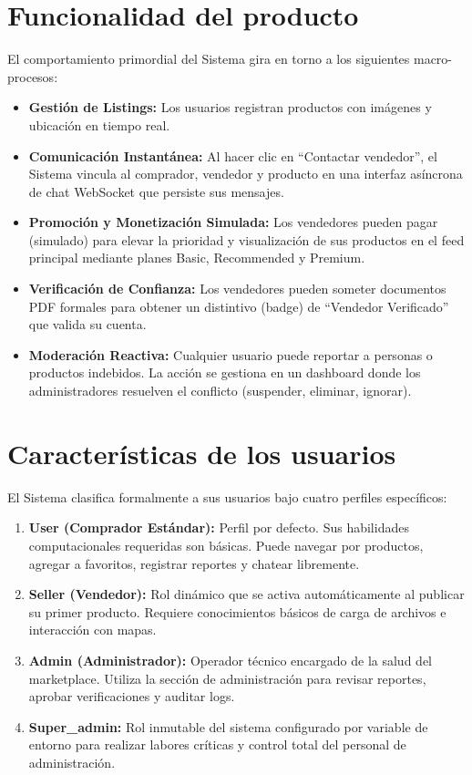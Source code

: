 \documentclass[11pt,a4paper]{report}
\begin{document}
\section{Funcionalidad del producto}
El comportamiento primordial del Sistema gira en torno a los siguientes macro-procesos:
\begin{itemize}
    \item \textbf{Gestión de Listings:} Los usuarios registran productos con imágenes y ubicación en tiempo real.
    \item \textbf{Comunicación Instantánea:} Al hacer clic en ``Contactar vendedor'', el Sistema vincula al comprador, vendedor y producto en una interfaz asíncrona de chat WebSocket que persiste sus mensajes.
    \item \textbf{Promoción y Monetización Simulada:} Los vendedores pueden pagar (simulado) para elevar la prioridad y visualización de sus productos en el feed principal mediante planes Basic, Recommended y Premium.
    \item \textbf{Verificación de Confianza:} Los vendedores pueden someter documentos PDF formales para obtener un distintivo (badge) de ``Vendedor Verificado'' que valida su cuenta.
    \item \textbf{Moderación Reactiva:} Cualquier usuario puede reportar a personas o productos indebidos. La acción se gestiona en un dashboard donde los administradores resuelven el conflicto (suspender, eliminar, ignorar).
\end{itemize}

\section{Características de los usuarios}
El Sistema clasifica formalmente a sus usuarios bajo cuatro perfiles específicos:
\begin{enumerate}
    \item \textbf{User (Comprador Estándar):} Perfil por defecto. Sus habilidades computacionales requeridas son básicas. Puede navegar por productos, agregar a favoritos, registrar reportes y chatear libremente.
    \item \textbf{Seller (Vendedor):} Rol dinámico que se activa automáticamente al publicar su primer producto. Requiere conocimientos básicos de carga de archivos e interacción con mapas.
    \item \textbf{Admin (Administrador):} Operador técnico encargado de la salud del marketplace. Utiliza la sección de administración para revisar reportes, aprobar verificaciones y auditar logs.
    \item \textbf{Super\_admin:} Rol inmutable del sistema configurado por variable de entorno para realizar labores críticas y control total del personal de administración.
\end{enumerate}
\end{document}
